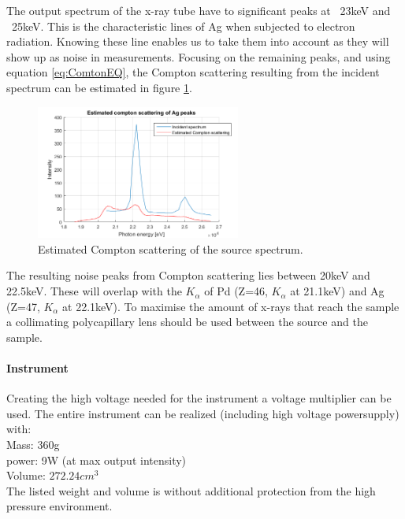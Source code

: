 The output spectrum of the x-ray tube have to significant peaks at ~23keV and ~25keV. This is the characteristic lines of Ag when subjected to electron radiation. Knowing these line enables us to take them into account as they will show up as noise in measurements. Focusing on the remaining peaks, and using equation \ref{eq:ComtonEQ}, the Compton scattering resulting from the incident spectrum can be estimated in figure \ref{fig:AgSpectraCompton}.

\begin{figure}[h]
	\centering
	\includegraphics[width=0.6\textwidth]{figures/XRF/estComptonAgPeaks.png}
	\caption{Estimated Compton scattering of the source spectrum.}
	\label{fig:AgSpectraCompton}
\end{figure}

The resulting noise peaks from Compton scattering lies between 20keV and 22.5keV. These will overlap with the $K_\alpha$ of Pd (Z=46, $K_\alpha$ at 21.1keV) and Ag (Z=47, $K_\alpha$ at 22.1keV).
To maximise the amount of x-rays that reach the sample a collimating polycapillary lens should be used between the source and the sample.

\paragraph{Instrument}
Creating the high voltage needed for the instrument a voltage multiplier can be used. The entire instrument can be realized (including high voltage powersupply) with\citep{AmptekSource}:\\
Mass: 360g\\
power: 9W (at max output intensity)\\
Volume: $272.24cm^{3}$\\
The listed weight and volume is without additional protection from the high pressure environment.

